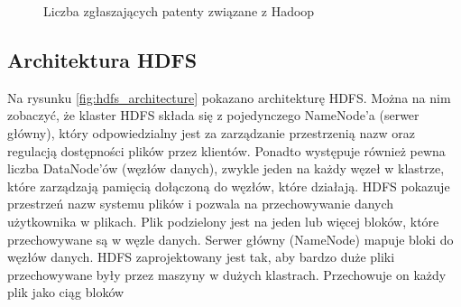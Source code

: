 \documentclass[10pt,twocolumn]{llncs}          %
\begin{document}
\begin{figure}
    \centering
    \caption{Liczba zgłaszających patenty związane z Hadoop}
    \label{fig:invent:hadoop}
\end{figure}

\subsection{Architektura HDFS}
\label{ssub:hdfs_architecture}
Na rysunku \ref{fig:hdfs_architecture} pokazano architekturę HDFS. Można na nim zobaczyć, że klaster HDFS składa się z pojedynczego NameNode'a (serwer główny), który odpowiedzialny jest za zarządzanie przestrzenią nazw oraz regulacją dostępności plików przez klientów. Ponadto występuje również pewna liczba DataNode'ów (węzłów danych), zwykle jeden na każdy węzeł w klastrze, które zarządzają pamięcią dołączoną do węzłów, które działają. HDFS pokazuje przestrzeń nazw systemu plików i pozwala na przechowywanie danych użytkownika w plikach. Plik podzielony jest na jeden lub więcej bloków, które przechowywane są w węzle danych. Serwer główny (NameNode) mapuje bloki do węzłów danych.
HDFS zaprojektowany jest tak, aby bardzo duże pliki przechowywane były przez maszyny w dużych klastrach. Przechowuje on  każdy plik jako ciąg bloków
\end{document}
